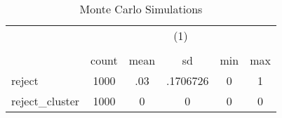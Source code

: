 \begin{table}[htbp]\centering
\def\sym#1{\ifmmode^{#1}\else\(^{#1}\)\fi}
\caption{Monte Carlo Simulations}
\begin{tabular}{l*{1}{ccccc}}
\hline\hline
            &\multicolumn{5}{c}{(1)}                                         \\
            &\multicolumn{5}{c}{}                                            \\
            &       count&        mean&          sd&         min&         max\\
\hline
reject      &        1000&         .03&    .1706726&           0&           1\\
reject\_cluster&        1000&           0&           0&           0&           0\\
\hline\hline
\end{tabular}
\end{table}
